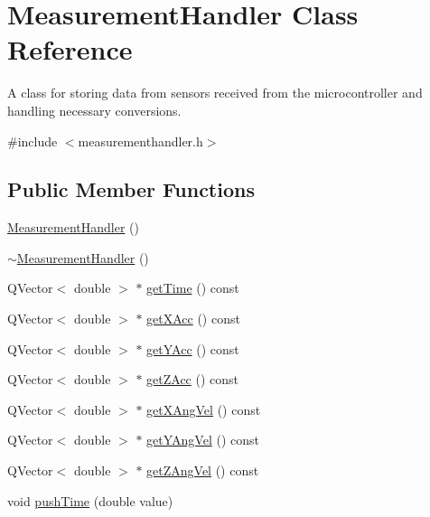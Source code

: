 \hypertarget{class_measurement_handler}{}\section{Measurement\+Handler Class Reference}
\label{class_measurement_handler}


A class for storing data from sensors received from the microcontroller and handling necessary conversions.  




{\ttfamily \#include $<$measurementhandler.\+h$>$}

\subsection*{Public Member Functions}
\begin{DoxyCompactItemize}
\item 
\mbox{\hyperlink{class_measurement_handler_a80f0638e83958605b26eb39e4e8a49e4}{Measurement\+Handler}} ()
\item 
\mbox{\hyperlink{class_measurement_handler_ab1f1ce3908fc0d88e350727efbd2949a}{$\sim$\+Measurement\+Handler}} ()
\item 
Q\+Vector$<$ double $>$ $\ast$ \mbox{\hyperlink{class_measurement_handler_a202be23096eca6bd4362a9aa5552b4f1}{get\+Time}} () const
\item 
Q\+Vector$<$ double $>$ $\ast$ \mbox{\hyperlink{class_measurement_handler_a4dd297cf8cc08203264492496b4378ee}{get\+X\+Acc}} () const
\item 
Q\+Vector$<$ double $>$ $\ast$ \mbox{\hyperlink{class_measurement_handler_a1c7cc1cd1c7e6a1629ad62877e22bd00}{get\+Y\+Acc}} () const
\item 
Q\+Vector$<$ double $>$ $\ast$ \mbox{\hyperlink{class_measurement_handler_aa9429cbbd110d64168635e9325dcf487}{get\+Z\+Acc}} () const
\item 
Q\+Vector$<$ double $>$ $\ast$ \mbox{\hyperlink{class_measurement_handler_ae5930434d2c8d66ac124f996fa9fd12d}{get\+X\+Ang\+Vel}} () const
\item 
Q\+Vector$<$ double $>$ $\ast$ \mbox{\hyperlink{class_measurement_handler_ae2053ba8ad1924ff0ad7c2538da7a35e}{get\+Y\+Ang\+Vel}} () const
\item 
Q\+Vector$<$ double $>$ $\ast$ \mbox{\hyperlink{class_measurement_handler_a89631c6b8b3ba7c1aab620bdcf595896}{get\+Z\+Ang\+Vel}} () const
\item 
void \mbox{\hyperlink{class_measurement_handler_a95dad9123275dbb03f9cd01852e82df5}{push\+Time}} (double value)

\end{DoxyCompactItemize}
